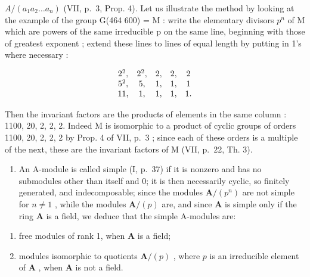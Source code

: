\(A/(a_{1}a_{2}\ldots a_{n})\) (VII, p.~3, Prop. 4). Let us illustrate the method by looking at the example of the group G(464 600) = M : write the elementary divisors \(p^{n}\) of M which are powers of the same irreducible p on the same line, beginning with those of greatest exponent ; extend these lines to lines of equal length by putting in 1's where necessary :

\[
\begin{array}{c c c c c} 2 ^ {2}, & 2 ^ {2}, & 2, & 2, & 2 \\ 5 ^ {2}, & 5, & 1, & 1, & 1 \\ 11, & 1, & 1, & 1, & 1. \end{array}
\]

Then the invariant factors are the products of elements in the same column : 1100, 20, 2, 2, 2. Indeed M is isomorphic to a product of cyclic groups of orders 1100, 20, 2, 2, 2 by Prop. 4 of VII, p.~3 ; since each of these orders is a multiple of the next, these are the invariant factors of M (VII, p.~22, Th. 3).

\begin{enumerate}
\def\labelenumi{\arabic{enumi})}
\setcounter{enumi}{3}
\tightlist
\item
  An A-module is called simple (I, p.~37) if it is nonzero and has no submodules other than itself and 0; it is then necessarily cyclic, so finitely generated, and indecomposable; since the modules \(\mathbf{A} / (p^n)\) are not simple for \(n \neq 1\) , while the modules \(\mathbf{A} / (p)\) are, and since \(\mathbf{A}\) is simple only if the ring \(\mathbf{A}\) is a field, we deduce that the simple A-modules are:
\end{enumerate}

\begin{enumerate}
\def\labelenumi{\alph{enumi})}
\item
  free modules of rank 1, when \(\mathbf{A}\) is a field;
\item
  modules isomorphic to quotients \(\mathbf{A} / (p)\) , where \(p\) is an irreducible element of \(\mathbf{A}\) , when \(\mathbf{A}\) is not a field.
\end{enumerate}

